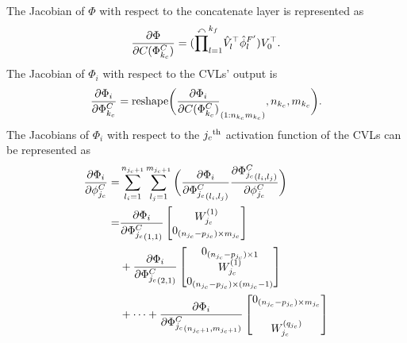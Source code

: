 \documentclass[letterpaper, 10 pt, conference]{ieeeconf}  %
\begin{document}
The Jacobian of $\Phi$ with respect to the concatenate layer is represented as
\begin{equation}
    {\partial \Phi\over\partial C(\Phi^C_{k_c})} = 
    (\overset{\curvearrowleft}\prod^{k_f}_{l=1} 
    {\hat V}^\top  _l {\hat\phi}_l^{F'}  ) V_0^\top  .
    \label{eq. dPhi/dC}
\end{equation}
The Jacobian of $\Phi_i$ with respect to the CVLs' output is
\begin{equation}
    {\partial \Phi_i\over\partial \Phi^C_{k_c}} = 
    \text{reshape}
    \bigg(
    {\partial \Phi_i\over\partial  C(\Phi^C_{k_c})}
    _{(1:n_{k_c}m_{k_c})}
    ,n_{k_c},m_{k_c}
    \bigg).
    \label{eq, dC/dPhi to dPhidPhi}    
\end{equation}
The Jacobians of $\Phi_i$ with respect to the $j_c\textsuperscript{th}$ activation function of the CVLs can be represented as
\begin{equation}
    \begin{aligned}
        {\partial \Phi_i\over\partial \phi^{C}_{j_c}} =&
        \sum_{l_i=1}^{n_{j_c+1}} \sum_{l_j=1}^{m_{j_c+1}} 
        \bigg(
            { \partial \Phi_i\over\partial {\Phi^C_{j_c}}_{(l_i,l_j)} }
            {\partial {\Phi^C_{j_c}}_{(l_i,l_j)}\over\partial \phi^{C}_{j_c}}
        \bigg)
        \\=&
        {\partial\Phi_i\over\partial {\Phi^C_{j_c}}_{(1,1)}}
        \begin{bmatrix}
            W_{{j_c}}^{(1)}\\ 0_{{(n_{{j_c}}}-p_{{j_c}})\times m_{{j_c}}}
        \end{bmatrix}
        \\&
        +
        {\partial\Phi_i\over\partial {\Phi^C_{j_c}}_{(2,1)}}
        \begin{bmatrix}
            0_{(n_{{j_c}}-p_{{j_c}})\times 1}\\ 
            W_{{j_c}}^{(1)}\\
            0_{({n_{{j_c}}}-p_{{j_c}})\times (m_{{j_c}}-1)}
        \end{bmatrix}
        \\
        &+\cdots
        +{\partial\Phi_i\over\partial {\Phi^C_{j_c}}_{(n_{j_c+1}, m_{j_c+1})}}
        \begin{bmatrix}
            0_{{(n_{{j_c}}}-p_{{j_c}})\times m_{{j_c}}}\\ \\ 
            W_{{j_c}}^{(q_{j_c})}
        \end{bmatrix}
        \end{aligned}
\end{equation}
\end{document}
